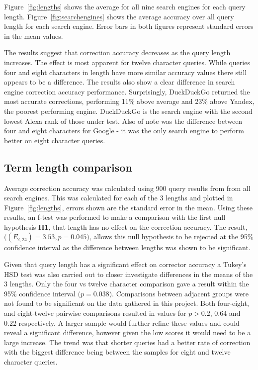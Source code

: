 \documentclass{csfourzero}
\begin{document}
Figure~\ref{fig:lengths} shows the average for all nine search engines for each query length. Figure~\ref{fig:searchengines} shows the average accuracy over all query length for each search engine. Error bars in both figures represent standard errors in the mean values.

The results suggest that correction accuracy decreases as the query length increases. The effect is most apparent for twelve character queries. While queries four and eight characters in length have more similar accuracy values there still appears to be a difference. The results also show a clear difference in search engine correction accuracy performance. Surprisingly, DuckDuckGo returned the most accurate corrections, performing 11\% above average and 23\% above Yandex, the poorest performing engine. DuckDuckGo is the search engine with the second lowest Alexa rank of those under test. Also of note was the difference between four and eight characters for Google - it was the only search engine to perform better on eight character queries.

\subsection{Term length comparison}
Average correction accuracy was calculated using 900 query results from from all search engines. This was calculated for each of the 3 lengths and plotted in Figure~\ref{fig:lengths}, errors shown are the standard error in the mean. Using these results, an f-test was performed to make a comparison with the first null hypothesis \textbf{H1}, that length has no effect on the correction accuracy. The result, $\big((F_{2,24}) = 3.53, p = 0.045\big)$, allows this null hypothesis to be rejected at the 95\% confidence interval as the difference between lengths was shown to be significant.

Given that query length has a significant effect on corrector accuracy a Tukey's HSD test was also carried out to closer investigate differences in the means of the 3 lengths. Only the four vs twelve character comparison gave a result within the 95\% confidence interval $\big(p = 0.038\big)$. Comparisons between adjacent groups were not found to be significant on the data gathered in this project. Both four-eight, and eight-twelve pairwise comparisons resulted in values for $p > 0.2$, $0.64$ and $0.22$ respectively. A larger sample would further refine these values and could reveal a significant difference, however given the low scores it would need to be a large increase. The trend was that shorter queries had a better rate of correction with the biggest difference being between the samples for eight and twelve character queries.
\end{document}
